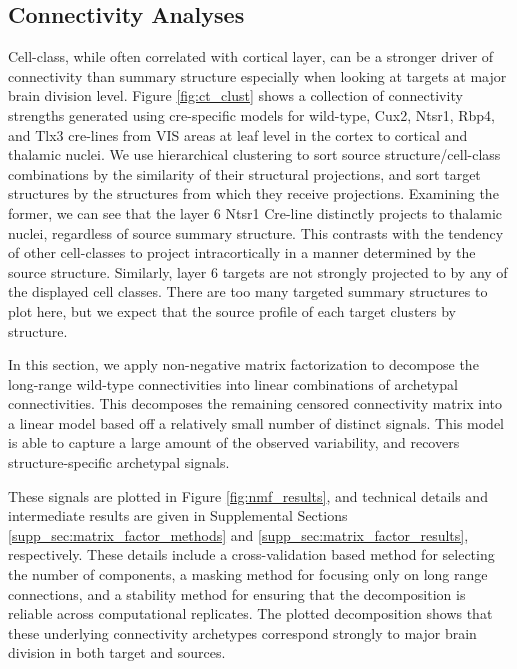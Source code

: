 \subsection{Connectivity Analyses}

Cell-class, while often correlated with cortical layer, can be a stronger driver of connectivity than summary structure especially when looking at targets at major brain division level.
Figure \ref{fig:ct_clust} shows a collection of connectivity strengths generated using cre-specific models for wild-type, Cux2, Ntsr1, Rbp4, and Tlx3 cre-lines from VIS areas at leaf level in the cortex to cortical and thalamic nuclei.
We use hierarchical clustering to sort source structure/cell-class combinations by the similarity of their structural projections, and sort target structures by the structures from which they receive projections.
Examining the former, we can see that the layer 6 Ntsr1 Cre-line distinctly projects to thalamic nuclei, regardless of source summary structure.
This contrasts with the tendency of other cell-classes to project intracortically in a manner determined by the source structure.
Similarly, layer 6 targets are not strongly projected to by any of the displayed cell classes.
There are too many targeted summary structures to plot here, but we expect that the source profile of each target clusters by structure.

In this section, we apply non-negative matrix factorization to decompose the long-range wild-type connectivities into linear combinations of archetypal connectivities.
This decomposes the remaining censored connectivity matrix into a linear model based off a relatively small number of distinct signals.
This model is able to capture a large amount of the observed variability, and recovers structure-specific archetypal signals.

These signals are plotted in Figure \ref{fig:nmf_results}, and technical details and intermediate results are given in Supplemental Sections \ref{supp_sec:matrix_factor_methods} and \ref{supp_sec:matrix_factor_results}, respectively.
These details include a cross-validation based method for selecting the number of components, a masking method for focusing only on long range connections, and a stability method for ensuring that the decomposition is reliable across computational replicates.
The plotted decomposition shows that these underlying connectivity archetypes correspond strongly to major brain division in both target and sources.

